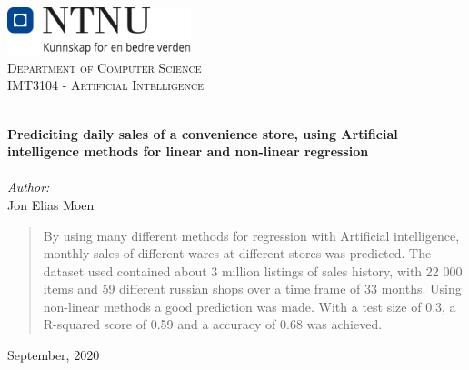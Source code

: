 
\begin{titlepage}
\vbox{ }
\vbox{ }
\begin{center}
\includegraphics[width=0.40\textwidth]{Images/NTNU_logo.png}\\[1cm]
\textsc{\LARGE Department of Computer Science}\\[1.5cm]
\textsc{\Large IMT3104 - Artificial Intelligence}\\[0.5cm]
\vbox{ }

\HRule \\[0.4cm]
{ \huge \bfseries Prediciting daily sales of a convenience store, using Artificial intelligence methods for linear and non-linear regression}\\[0.4cm]
\HRule \\[1.5cm]

\large
\emph{Author:}\\
Jon Elias Moen

\begin{abstract}
    By using many different methods for regression with Artificial intelligence, monthly sales of different wares at different stores was predicted. The dataset used contained about 3 million listings of sales history, with 22 000 items and 59 different russian shops over a time frame of 33 months. Using non-linear methods a good prediction was made. With a test size of 0.3, a R-squared score of 0.59 and a accuracy of 0.68 was achieved. 
\end{abstract}

\vfill

{\large September, 2020}
\end{center}
\end{titlepage}